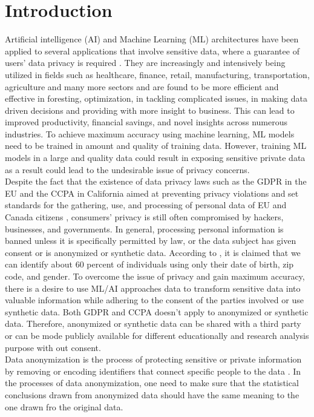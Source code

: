 \section{Introduction}
\label{sec:introduction}
Artificial intelligence (AI) and Machine Learning (ML) architectures have been applied to several applications that involve sensitive data, where a  guarantee  of  users’  data  privacy  is  required \cite{arous2023exploring}. They are increasingly and intensively being utilized in fields such as healthcare, finance, retail, manufacturing, transportation, agriculture and many more sectors and are found to be more efficient and effective in foresting, optimization, in tackling complicated issues, in making data driven decisions and providing with more insight to business\cite{bigbookml}. This can lead to improved productivity, financial savings, and novel insights across numerous industries. To achieve maximum accuracy using machine learning, ML models need to be trained in amount and quality of training data. However, training ML models in a large and quality data could result in exposing sensitive private data\cite{soykan2022survey} as a result could lead to the undesirable issue of privacy concerns.\\
Despite the fact that the existence of data privacy laws such as the GDPR in the EU and the CCPA in California aimed at preventing privacy violations and set standards for the gathering, use, and processing of personal data of EU and Canada citizens \cite{goldsteen2022anonymizing}, consumers' privacy is still often compromised by hackers, businesses, and governments\cite{newman2020gdpr}. In general, processing personal information is banned unless it is specifically permitted by law, or the data subject has given consent or is anonymized or synthetic data\cite{Einwilligung}. According to \cite{xiangmin2010research}, it is claimed that we can identify about 60 percent of individuals using only their date of birth, zip code, and gender. To overcome the issue of privacy and gain maximum accuracy, there is a desire to use ML/AI approaches data to transform sensitive data into valuable information while adhering to the consent of the parties involved or use synthetic data. Both GDPR and CCPA doesn't apply to anonymized or synthetic data\cite{soykan2022survey, oprescu2022energy}. Therefore, anonymized or synthetic data can be shared with a third party or can be mode publicly available for different educationally and research analysis purpose with out consent.\\
Data anonymization is the process of protecting sensitive or private information by removing or encoding identifiers that connect specific people to the data \cite{}. In the processes of data anonymization, one need to make sure that the statistical conclusions drawn from anonymized data should have the same meaning to the one drawn fro  the original data. \\
